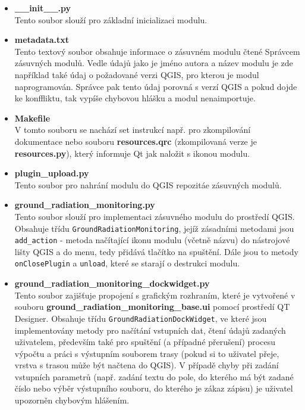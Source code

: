 \begin{itemize} %
	\item \textbf{\_\_init\_\_.py} \\ 
		Tento soubor slouží pro základní inicializaci modulu.
		 
	\item \textbf{metadata.txt} \\
		Tento textový soubor obsahuje informace o zásuvném modulu čtené Správcem zásuvných modulů. Vedle údajů jako je jméno autora a název modulu je zde například také údaj o požadované verzi QGIS, pro kterou je modul naprogramován. Správce pak tento údaj porovná s verzí QGIS a pokud dojde ke konffliktu, tak vypíše chybovou hlášku a modul nenaimportuje.
	
	\item \textbf{Makefile} \\
		V tomto souboru se nachází set instrukcí např. pro zkompilování dokumentace nebo souboru \textbf{resources.qrc} (zkompilovaná verze je \textbf{resources.py}), který informuje Qt jak naložit s ikonou modulu.
		
	\item \textbf{plugin\_upload.py} \\
		Tento soubor pro nahrání modulu do QGIS repozitáe zásuvných modulů.

	\item \textbf{ground\_radiation\_monitoring.py} \\
		Tento soubor slouží pro implementaci zásuvného modulu do prostředí QGIS. Obsahuje třídu \texttt{GroundRadiationMonitoring}, jejíž zásadními metodami jsou \texttt{add\_action} - metoda načítající ikonu modulu (včetně názvu) do nástrojové lišty QGIS a do menu, tedy přidává tlačítko na spuštění. Dále jsou to metody \texttt{onClosePlugin} a \texttt{unload}, které se starají o destrukci modulu.

	\item \textbf{ground\_radiation\_monitoring\_dockwidget.py} \\
		Tento soubor zajišťuje propojení s grafickým rozhraním, které je vytvořené v souboru \textbf{ground\_radiation\_monitoring\_base.ui} pomocí prostředí QT Designer. Obsahuje třídu \texttt{GroundRadiationDockWidget}, ve které jsou implementovány metody pro načítání vstupních dat, čtení údajů zadaných uživatelem, především také pro spuštění (a případné přerušení) procesu výpočtu a práci s výstupním souborem trasy (pokud si to uživatel přeje, vrstva s trasou může být načtena do QGIS). V případě chyby při zadání vstupních parametrů (např. zadání textu do pole, do kterého má být zadané číslo nebo výběr výstupního souboru, do kterého je zákaz zápisu) je uživatel upozorněn chybovým hlášením.     
	

\end{itemize}
